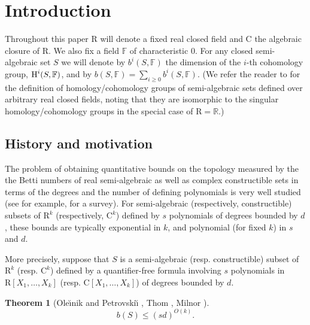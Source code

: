 \documentclass{amsart}
\newtheorem{theorem}{Theorem}
\theoremstyle{definition}
\theoremstyle{remark}
\numberwithin{equation}{section}
\begin{document}
\maketitle
\tableofcontents

\section{Introduction}
\label{sec:intro}
Throughout this paper ${\mathrm{R}}$ will denote a fixed real closed field and ${\mathrm{C}}$ the algebraic closure of ${\mathrm{R}}$. 
We also fix a field ${\mathbb{F}}$ of characteristic $0$.
For any 
closed
semi-algebraic set $S$ we will denote by $b^i(S,{\mathbb{F}})$ the dimension of the $i$-th cohomology group,
${\mbox{\rm H}}^i(S,{\mathbb{F}})$, and by $b(S,{\mathbb{F}}) = \sum_{i \geq 0} b^i(S,{\mathbb{F}})$.
 (We refer the reader to 
\cite[Chapter 6]{BPRbook2} for the definition of homology/cohomology  groups of semi-algebraic
sets defined over arbitrary real closed fields, noting that they are isomorphic to the singular 
homology/cohomology groups in the special case of ${\mathrm{R}} = \mathbb{R}$.)

\subsection{History and motivation}
\label{subsec:history}
The problem of obtaining quantitative bounds on the topology measured by the the Betti numbers 
of real semi-algebraic as well as
complex constructible sets in terms of the degrees and the number of defining polynomials is
very well studied (see for example, \cite{BPR10} for a survey). For semi-algebraic (respectively, constructible) subsets of ${\mathrm{R}}^k$ (respectively, ${\mathrm{C}}^k$) defined by $s$ polynomials of degrees bounded by $d$, these bounds are typically exponential in $k$, and polynomial (for fixed $k$) in $s$ and $d$.

More precisely, suppose that $S$  is a semi-algebraic 
(resp. constructible) subset of ${\mathrm{R}}^k$  (resp. ${\mathrm{C}}^k$) defined by a quantifier-free formula involving
$s$ polynomials in ${\mathrm{R}}[X_1,\ldots,X_k]$ (resp. ${\mathrm{C}}[X_1,\ldots,X_k]$) of degrees bounded by $d$.

\begin{theorem}[Ole{\u\i}nik and Petrovski{\u\i} \cite{OP}, Thom \cite{T}, Milnor \cite{Milnor2}]
\label{thm:classical}
\[
b(S) \leq (s d)^{O(k)}.
\]
\end{theorem}
\end{document}
